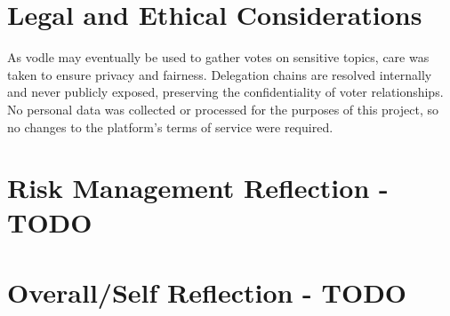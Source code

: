 \section{Legal and Ethical Considerations}

As vodle may eventually be used to gather votes on sensitive topics, care was taken to ensure privacy and fairness. Delegation chains are resolved internally and never publicly exposed, preserving the confidentiality of voter relationships. No personal data was collected or processed for the purposes of this project, so no changes to the platform's terms of service were required.

\section{Risk Management Reflection - TODO}

\section{Overall/Self Reflection - TODO}
